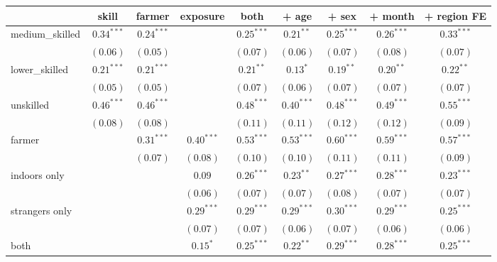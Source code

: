 
\begin{table}
\begin{center}
\begin{tabular}{l c c c c c c c c}
\hline
 & skill & farmer & exposure & both & + age & + sex & + month & + region FE \\
\hline
medium\_skilled & $0.34^{***}$ & $0.24^{***}$ &              & $0.25^{***}$ & $0.21^{**}$  & $0.25^{***}$ & $0.26^{***}$  & $0.33^{***}$  \\
                & $(0.06)$     & $(0.05)$     &              & $(0.07)$     & $(0.06)$     & $(0.07)$     & $(0.08)$      & $(0.07)$      \\
lower\_skilled  & $0.21^{***}$ & $0.21^{***}$ &              & $0.21^{**}$  & $0.13^{*}$   & $0.19^{**}$  & $0.20^{**}$   & $0.22^{**}$   \\
                & $(0.05)$     & $(0.05)$     &              & $(0.07)$     & $(0.06)$     & $(0.07)$     & $(0.07)$      & $(0.07)$      \\
unskilled       & $0.46^{***}$ & $0.46^{***}$ &              & $0.48^{***}$ & $0.40^{***}$ & $0.48^{***}$ & $0.49^{***}$  & $0.55^{***}$  \\
                & $(0.08)$     & $(0.08)$     &              & $(0.11)$     & $(0.11)$     & $(0.12)$     & $(0.12)$      & $(0.09)$      \\
farmer          &              & $0.31^{***}$ & $0.40^{***}$ & $0.53^{***}$ & $0.53^{***}$ & $0.60^{***}$ & $0.59^{***}$  & $0.57^{***}$  \\
                &              & $(0.07)$     & $(0.08)$     & $(0.10)$     & $(0.10)$     & $(0.11)$     & $(0.11)$      & $(0.09)$      \\
indoors only    &              &              & $0.09$       & $0.26^{***}$ & $0.23^{**}$  & $0.27^{***}$ & $0.28^{***}$  & $0.23^{***}$  \\
                &              &              & $(0.06)$     & $(0.07)$     & $(0.07)$     & $(0.08)$     & $(0.07)$      & $(0.07)$      \\
strangers only  &              &              & $0.29^{***}$ & $0.29^{***}$ & $0.29^{***}$ & $0.30^{***}$ & $0.29^{***}$  & $0.25^{***}$  \\
                &              &              & $(0.07)$     & $(0.07)$     & $(0.06)$     & $(0.07)$     & $(0.06)$      & $(0.06)$      \\
both            &              &              & $0.15^{*}$   & $0.25^{***}$ & $0.22^{**}$  & $0.29^{***}$ & $0.28^{***}$  & $0.25^{***}$  \\

\end{tabular}
\end{center}
\end{table}
